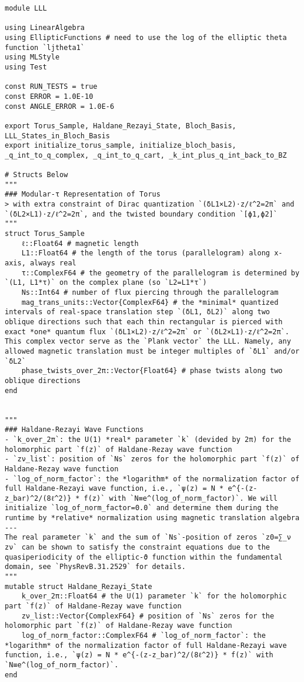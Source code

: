 \begin{verbatim}
module LLL

using LinearAlgebra
using EllipticFunctions # need to use the log of the elliptic theta function `ljtheta1`
using MLStyle
using Test

const RUN_TESTS = true
const ERROR = 1.0E-10
const ANGLE_ERROR = 1.0E-6

export Torus_Sample, Haldane_Rezayi_State, Bloch_Basis, LLL_States_in_Bloch_Basis
export initialize_torus_sample, initialize_bloch_basis, _q_int_to_q_complex, _q_int_to_q_cart, _k_int_plus_q_int_back_to_BZ

# Structs Below
"""
### Modular-τ Representation of Torus
> with extra constraint of Dirac quantization `(δL1×L2)⋅z/ℓ^2=2π` and `(δL2×L1)⋅z/ℓ^2=2π`, and the twisted boundary condition `[ϕ1,ϕ2]`
"""
struct Torus_Sample
    ℓ::Float64 # magnetic length
    L1::Float64 # the length of the torus (parallelogram) along x-axis, always real
    τ::ComplexF64 # the geometry of the parallelogram is determined by `(L1, L1*τ)` on the complex plane (so `L2=L1*τ`)
    Ns::Int64 # number of flux piercing through the parallelogram
    mag_trans_units::Vector{ComplexF64} # the *minimal* quantized intervals of real-space translation step `(δL1, δL2)` along two oblique directions such that each thin rectangular is pierced with exact *one* quantum flux `(δL1×L2)⋅z/ℓ^2=2π` or `(δL2×L1)⋅z/ℓ^2=2π`. This complex vector serve as the `Plank vector` the LLL. Namely, any allowed magnetic translation must be integer multiples of `δL1` and/or `δL2`
    phase_twists_over_2π::Vector{Float64} # phase twists along two oblique directions
end


"""
### Haldane-Rezayi Wave Functions
- `k_over_2π`: the U(1) *real* parameter `k` (devided by 2π) for the holomorphic part `f(z)` of Haldane-Rezay wave function
- `zν_list`: position of `Ns` zeros for the holomorphic part `f(z)` of Haldane-Rezay wave function
- `log_of_norm_factor`: the *logarithm* of the normalization factor of full Haldane-Rezayi wave function, i.e., `ψ(z) = N * e^{-(z-z_bar)^2/(8ℓ^2)} * f(z)` with `N≡e^(log_of_norm_factor)`. We will initialize `log_of_norm_factor=0.0` and determine them during the runtime by *relative* normalization using magnetic translation algebra
---
The real parameter `k` and the sum of `Ns`-position of zeros `z0=∑_ν zν` can be shown to satisfy the constraint equations due to the quasiperiodicity of the elliptic-ϑ function within the fundamental domain, see `PhysRevB.31.2529` for details.
"""
mutable struct Haldane_Rezayi_State
    k_over_2π::Float64 # the U(1) parameter `k` for the holomorphic part `f(z)` of Haldane-Rezay wave function 
    zν_list::Vector{ComplexF64} # position of `Ns` zeros for the holomorphic part `f(z)` of Haldane-Rezay wave function 
    log_of_norm_factor::ComplexF64 # `log_of_norm_factor`: the *logarithm* of the normalization factor of full Haldane-Rezayi wave function, i.e., `ψ(z) = N * e^{-(z-z_bar)^2/(8ℓ^2)} * f(z)` with `N≡e^(log_of_norm_factor)`.
end



\end{verbatim}
